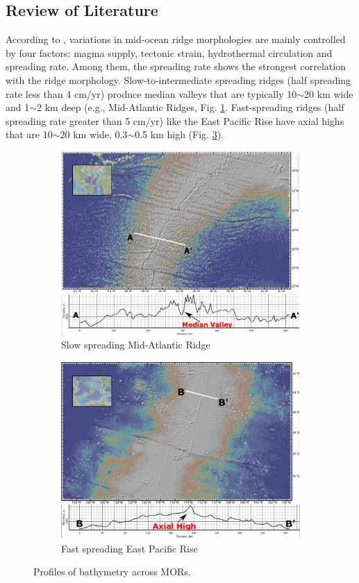 \subsection{Review of Literature}
According to \citep{Fowler2004}, variations in mid-ocean ridge morphologies are mainly controlled by four factors: magma supply, tectonic strain, hydrothermal circulation and spreading rate. Among them, the spreading rate shows the strongest correlation with the ridge morphology. Slow-to-intermediate spreading ridges (half spreading rate less than 4 cm/yr) produce median valleys that are typically 10$\sim$20 km wide and 1$\sim$2 km deep (e.g., Mid-Atlantic Ridges, Fig. \ref{fig_Intro1_1}. Fast-spreading ridges (half spreading rate greater than 5 cm/yr) like the East Pacific Rise have axial highs that are 10$\sim$20 km wide, 0.3$\sim$0.5 km high (Fig. \ref{fig_Intro1_3}).
%
\begin{figure}[H]
\centering
\begin{subfigure}{.5\textwidth}
  \centering
  \includegraphics[width=.8\linewidth]{./Figures/fig_Intro1_1.png}
  \caption{\small{Slow spreading Mid-Atlantic Ridge}}
  \label{fig_Intro1_1}
\end{subfigure}%
\begin{subfigure}{.5\textwidth}
  \centering
  \includegraphics[width=.8\linewidth]{./Figures/fig_Intro1_3.png}
  \caption{\small{Fast spreading East Pacific Rise}}
  \label{fig_Intro1_3}
\end{subfigure}
\caption{\small{Profiles of bathymetry across MORs.}}
\end{figure}
